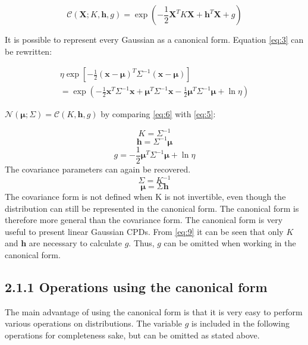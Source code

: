 \documentclass[12pt,oneside,openany,a4paper, %
afrikaans,english,
]{memoir}
\numberwithin{equation}{chapter}
\begin{document}
\begin{equation}\label{eq:5}
\mathcal{C}(\bm{X}; K,\bm{h},g) = \exp\left(-\frac{1}{2}\bm{X}^TK\bm{X} + \bm{h}^T\bm{X} +g \right)
\end{equation}

It is possible to represent every Gaussian as a canonical form. Equation \ref{eq:3} can be rewritten:


\begin{multline}\label{eq:6}
\eta\exp\left[-\frac{1}{2}(\bm{x}-\bm{\mu})^T\Sigma^{-1}(\bm{x}-\bm{\mu})\right]
\\ = \exp\left(-\frac{1}{2}\bm{x}^T\Sigma^{-1}\bm{x} + \bm{\mu}^T\Sigma^{-1}\bm{x} - \frac{1}{2}\bm{\mu}^T\Sigma^{-1}\bm{\mu} + \ln{\eta}\right)
\end{multline}


$\mathcal{N}(\bm{\mu}; \Sigma) = \mathcal{C}(K,\bm{h}, g)$ by comparing \ref{eq:6} with \ref{eq:5}:

\begin{equation}\label{eq:7}
K = \Sigma^{-1}
\end{equation}
\begin{equation}\label{eq:8}
\bm{h} = \Sigma^{-1}\bm{\mu}
\end{equation}
\begin{equation}\label{eq:9}
g = - \frac{1}{2}\bm{\mu}^T\Sigma^{-1}\bm{\mu} + \ln{\eta}
\end{equation}
The covariance parameters can again be recovered. 
\begin{equation}
\Sigma = K^{-1}
\end{equation}
\begin{equation}
\bm{\mu} = \Sigma\bm{h}
\end{equation}
The covariance form is not defined when K is not invertible, even though the distribution can still be represented in the canonical form. The canonical form is therefore more general than the covariance form. The canonical form is very useful to present linear Gaussian CPDs. From \ref{eq:9} it can be seen that only $K$ and $\bm{h}$ are necessary to calculate $g$. Thus, $g$ can be omitted when working in the canonical form. \\


\subsection{2.1.1 Operations using the canonical form}
The main advantage of using the canonical form is that it is very easy to perform various operations on distributions. The variable $g$ is included in the following operations for completeness sake, but can be omitted as stated above.
\end{document}
